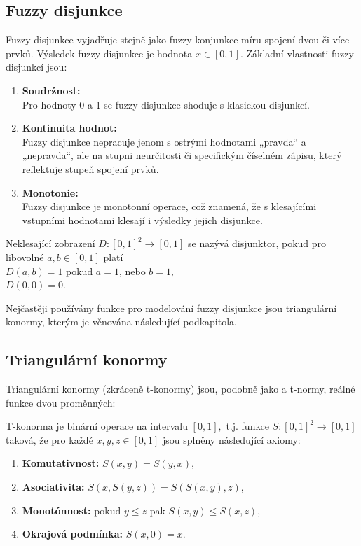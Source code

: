 \subsection{Fuzzy disjunkce} 
Fuzzy disjunkce vyjadřuje stejně jako fuzzy konjunkce míru spojení dvou či více prvk\r u. Výsledek fuzzy disjunkce je hodnota $x \in [0,1].$ 
Základní vlastnosti fuzzy disjunkcí jsou:
\begin{enumerate}
    \item \textbf{Soudržnost:}\\
    Pro hodnoty 0 a 1 se fuzzy disjunkce shoduje s klasickou disjunkcí.
    \item \textbf{Kontinuita hodnot:}\\
    Fuzzy disjunkce nepracuje jenom s  ostrými hodnotami „pravda“ a „nepravda“, ale na stupni neurčitosti či specifickým číselném zápisu, který reflektuje stupeň spojení prvk\r u.
   \item \textbf{Monotonie:}\\
    Fuzzy disjunkce je monotonní operace, což znamená, že s klesajícími vstupními hodnotami klesají i výsledky jejich disjunkce.
\end{enumerate}

\begin{definition}
    \cite{Kolo}
    Neklesající zobrazení $D: [0,1]^2 \rightarrow [0,1]$ se nazývá disjunktor, pokud pro libovolné $a, b \in [0,1]$ platí\\ $D(a,b) = 1$ pokud  $a = 1$, nebo  $b = 1,$\\
    $D(0,0) = 0.$
\end{definition}

Nej\v cast\v eji pou\v z\'iv\'any funkce pro modelov\'an\'i fuzzy disjunkce jsou triangul\'arn\'i konormy, kter\'ym je v\v enov\'ana n\'asleduj\'ic\'i podkapitola.

\subsection{Triangul\'arn\'i konormy} 
\label{sec: Triangulární konormy}

Triangulární konormy (zkráceně t-konormy) jsou, podobn\v e jako a t-normy, re\'aln\'e funkce dvou prom\v enn\'ych:
\begin{definition}
    T-konorma je binární operace na intervalu $[0,1],$ t.j. funkce $S: [0,1]^2 \rightarrow [0,1]$ taková, že pro každé $x, y, z \in [0,1]$ jsou splněny následující axiomy:
    \begin{enumerate}
        \item \textbf{Komutativnost: } $S(x,y) = S(y,x),$
        \item \textbf{Asociativita: } $S(x,S(y,z)) = S(S(x,y),z)$,
        \item \textbf{Monotónnost:} pokud $y \leq z$ pak $S(x, y) \leq S(x, z)$,
        \item \textbf{Okrajová podmínka: } $S(x,0) = x.$
    \end{enumerate}
\end{definition}

